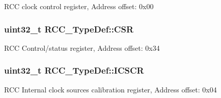 R\-C\-C clock control register, Address offset\-: 0x00 \hypertarget{struct_r_c_c___type_def_a7e913b8bf59d4351e1f3d19387bd05b9}{
\subsubsection[{C\-S\-R}]{ uint32\-\_\-t R\-C\-C\-\_\-\-Type\-Def\-::\-C\-S\-R}}\label{struct_r_c_c___type_def_a7e913b8bf59d4351e1f3d19387bd05b9}
R\-C\-C Control/status register, Address offset\-: 0x34 \hypertarget{struct_r_c_c___type_def_a5aa77c68f2409fff241e949f3d6129b5}{
\subsubsection[{I\-C\-S\-C\-R}]{ uint32\-\_\-t R\-C\-C\-\_\-\-Type\-Def\-::\-I\-C\-S\-C\-R}}\label{struct_r_c_c___type_def_a5aa77c68f2409fff241e949f3d6129b5}
R\-C\-C Internal clock sources calibration register, Address offset\-: 0x04 

